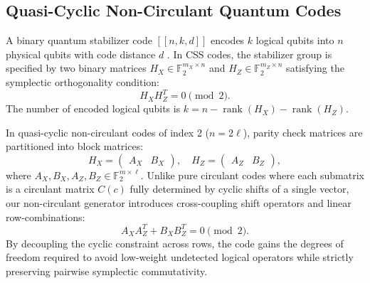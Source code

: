 \documentclass[11pt,a4paper]{article}
\begin{document}
\subsection{Quasi-Cyclic Non-Circulant Quantum Codes}
\label{sec:qecc_framework}
A binary quantum stabilizer code $[[n, k, d]]$ encodes $k$ logical qubits into $n$ physical qubits with code distance $d$ \cite{gottesman1996stabilizer, calderbank1998quantum}. In CSS codes, the stabilizer group is specified by two binary matrices $H_X \in \mathbb{F}_2^{m_X \times n}$ and $H_Z \in \mathbb{F}_2^{m_Z \times n}$ satisfying the symplectic orthogonality condition:
\begin{equation}
\label{eq:symplectic}
H_X H_Z^T = 0 \pmod 2.
\end{equation}
The number of encoded logical qubits is $k = n - \operatorname{rank}(H_X) - \operatorname{rank}(H_Z)$.

In quasi-cyclic non-circulant codes of index 2 ($n = 2\ell$), parity check matrices are partitioned into block matrices:
\begin{equation}
\label{eq:block_matrix}
H_X = \begin{pmatrix} A_X & B_X \end{pmatrix}, \quad H_Z = \begin{pmatrix} A_Z & B_Z \end{pmatrix},
\end{equation}
where $A_X, B_X, A_Z, B_Z \in \mathbb{F}_2^{m \times \ell}$. Unlike pure circulant codes where each submatrix is a circulant matrix $C(c)$ fully determined by cyclic shifts of a single vector, our non-circulant generator introduces cross-coupling shift operators and linear row-combinations:
\begin{equation}
\label{eq:commutation_condition}
A_X A_Z^T + B_X B_Z^T = 0 \pmod 2.
\end{equation}
By decoupling the cyclic constraint across rows, the code gains the degrees of freedom required to avoid low-weight undetected logical operators while strictly preserving pairwise symplectic commutativity.
\end{document}
